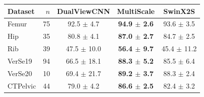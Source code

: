 \begin{tabular}{lrccc}
\toprule
Dataset & $n$ & DualViewCNN & MultiScale & SwinX2S \\
\midrule
Femur & 75 & 92.5 $\pm$ 4.7 & \textbf{94.9 $\pm$ 2.6} & 93.6 $\pm$ 3.5 \\
Hip & 35 & 80.8 $\pm$ 4.1 & \textbf{87.0 $\pm$ 2.7} & 84.7 $\pm$ 2.5 \\
Rib & 39 & 47.5 $\pm$ 10.0 & \textbf{56.4 $\pm$ 9.7} & 45.4 $\pm$ 11.2 \\
VerSe19 & 94 & 66.5 $\pm$ 18.1 & \textbf{88.3 $\pm$ 5.2} & 85.5 $\pm$ 6.4 \\
VerSe20 & 10 & 69.4 $\pm$ 21.7 & \textbf{89.2 $\pm$ 3.7} & 88.3 $\pm$ 2.4 \\
CTPelvic & 44 & 79.0 $\pm$ 4.2 & \textbf{86.6 $\pm$ 2.5} & 82.4 $\pm$ 3.2 \\
\bottomrule
\end{tabular}
